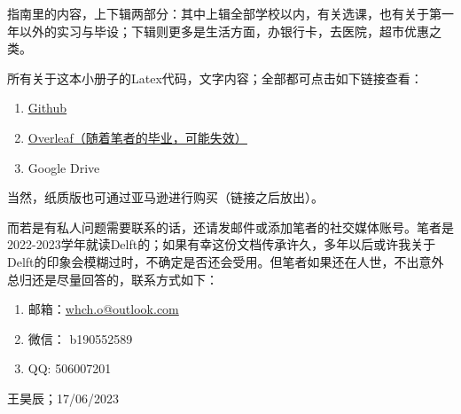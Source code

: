 指南里的内容，上下辑两部分：其中上辑全部学校以内，有关选课，也有关于第一年以外的实习与毕设；下辑则更多是生活方面，办银行卡，去医院，超市优惠之类。

所有关于这本小册子的Latex代码，文字内容；全部都可点击如下链接查看：
\begin{enumerate}
\item \href{https://github.com/HochanWang/BMD-ZhiNan}{\uline{Github}}
\item \href{https://www.overleaf.com/9181971742xyhrjrdxdzkt}{\uline{Overleaf（随着笔者的毕业，可能失效）}}
\item Google Drive
\end{enumerate}

当然，纸质版也可通过亚马逊进行购买（链接之后放出）。

而若是有私人问题需要联系的话，还请发邮件或添加笔者的社交媒体账号。笔者是2022-2023学年就读Delft的；如果有幸这份文档传承许久，多年以后或许我关于Delft的印象会模糊过时，不确定是否还会受用。但笔者如果还在人世，不出意外总归还是尽量回答的，联系方式如下：
\begin{enumerate}
\item 邮箱：\href{mailto:whch.o@outlook.com}{whch.o@outlook.com}
\item 微信： b190552589
\item QQ: 506007201
\end{enumerate}

\begin{flushright}
王昊辰；17/06/2023
\end{flushright}
